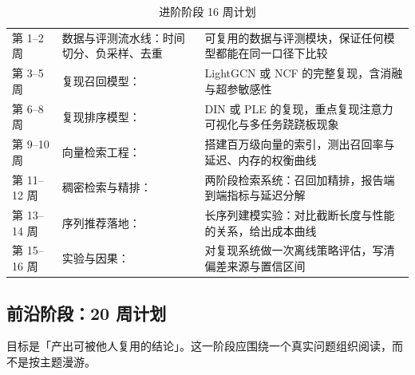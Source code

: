 \begin{table}[htbp]
\centering
\caption{进阶阶段 16 周计划}
\label{tab:plan-advanced}
\small
\begin{tabularx}{\textwidth}{L{1.4cm} L{3.4cm} Y}
\toprule
{} &  &  \\
\midrule
第 1--2 周 & 数据与评测流水线：时间切分、负采样、去重 &
可复用的数据与评测模块，保证任何模型都能在同一口径下比较 \\
第 3--5 周 & 复现召回模型：\cite{he2020lightgcn,he2017ncf} &
LightGCN 或 NCF 的完整复现，含消融与超参敏感性 \\
第 6--8 周 & 复现排序模型：\cite{zhou2018din,tang2020ple} &
DIN 或 PLE 的复现，重点复现注意力可视化与多任务跷跷板现象 \\
第 9--10 周 & 向量检索工程：\cite{johnson2019faiss,malkov2020hnsw} &
搭建百万级向量的索引，测出召回率与延迟、内存的权衡曲线 \\
第 11--12 周 & 稠密检索与精排：\cite{khattab2020colbert,nogueira2019monobert,xiong2020ance} &
两阶段检索系统：召回加精排，报告端到端指标与延迟分解 \\
第 13--14 周 & 序列推荐落地：\cite{kang2018sasrec,zhai2024hstu} &
长序列建模实验：对比截断长度与性能的关系，给出成本曲线 \\
第 15--16 周 & 实验与因果：\cite{kohavi2020trustworthy,pearl2009causality} &
对复现系统做一次离线策略评估，写清偏差来源与置信区间 \\
\bottomrule
\end{tabularx}
\end{table}

\subsection{前沿阶段：20 周计划}

目标是「产出可被他人复用的结论」。这一阶段应围绕一个真实问题组织阅读，而不是按主题漫游。

